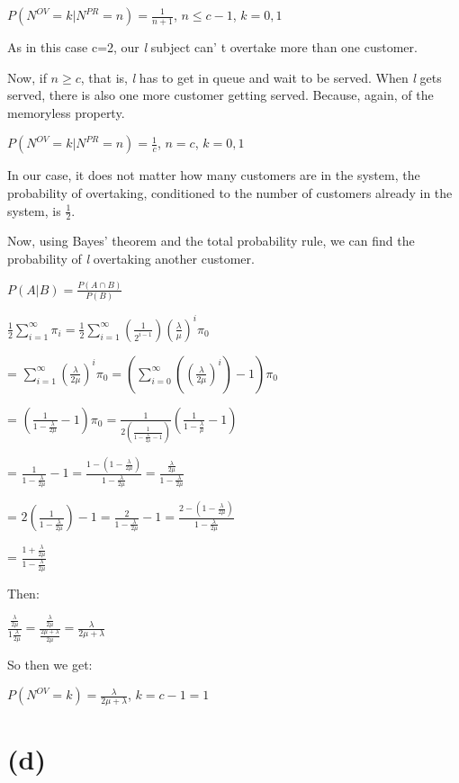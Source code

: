 \documentclass[]{article}
\begin{document}
\(P(N^{OV} = k | N^{PR} = n) = \frac{1}{n+1}\), \(n \leq c - 1\),
\(k = 0,1\)

As in this case c=2, our \emph{l} subject can' t overtake more than one
customer.

Now, if \(n \geq c\), that is, \emph{l} has to get in queue and wait to
be served. When \emph{l} gets served, there is also one more customer
getting served. Because, again, of the memoryless property.

\(P(N^{OV} = k | N^{PR} = n) = \frac{1}{c}\), \(n = c\), \(k = 0,1\)

In our case, it does not matter how many customers are in the system,
the probability of overtaking, conditioned to the number of customers
already in the system, is \(\frac{1}{2}\).

Now, using Bayes' theorem and the total probability rule, we can find
the probability of \emph{l} overtaking another customer.

\(P(A | B) = \frac{P(A \cap B)}{P(B)}\)

\(\frac{1}{2} \sum_{i=1}^{\infty} \pi_i = \frac{1}{2} \sum_{i=1}^{\infty} (\frac{1}{2^{i-1}}) (\frac{\lambda}{\mu})^{i} \pi_0\)

=
\(\sum_{i=1}^{\infty} (\frac{\lambda}{2 \mu})^i \pi_0 = (\sum_{i=0}^{\infty} ((\frac{\lambda}{2 \mu})^i) - 1) \pi_0\)

=
\((\frac{1}{1-\frac{\lambda}{2 \mu}} - 1) \pi_0 = \frac{1}{2 (\frac{1}{1 - \frac{\lambda}{2 \mu} - 1})} (\frac{1}{1 - \frac{\lambda}{\mu}} - 1)\)

=
\(\frac{1}{1 - \frac{\lambda}{2 \mu}} - 1 = \frac{1 - (1 - \frac{\lambda}{2 \mu})}{1 - \frac{\lambda}{2 \mu}} = \frac{\frac{\lambda}{2 \mu}}{1 - \frac{\lambda}{2 \mu}}\)

=
\(2 (\frac{1}{1 - \frac{\lambda}{2 \mu}}) - 1 = \frac{2}{1 - \frac{\lambda}{2 \mu}} - 1 = \frac{2 - (1 - \frac{\lambda}{2 \mu})}{1 - \frac{\lambda}{2 \mu}}\)

= \(\frac{1 + \frac{\lambda}{2 \mu}}{1 - \frac{\lambda}{2 \mu}}\)

Then:

\(\frac{\frac{\lambda}{2 \mu}}{1 \frac{\lambda}{2 \mu}} = \frac{\frac{\lambda}{2 \mu}}{\frac{2 \mu + \lambda}{2 \mu}} = \frac{\lambda}{2 \mu + \lambda}\)

So then we get:

\(P(N^{OV} = k) = \frac{\lambda}{2 \mu + \lambda}\), \(k = c-1 = 1\)

\hypertarget{d-1}{%
\section{(d)}\label{d-1}}
\end{document}

